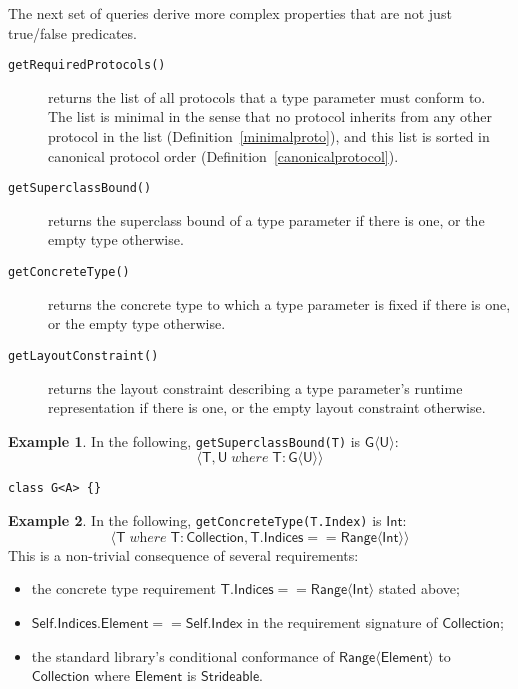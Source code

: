 \documentclass[headsepline,bibliography=totoc]{scrreport}
\newcommand{\namesym}[1]{\mathsf{#1}}
\newcommand{\genericparam}[1]{\bm{\mathsf{#1}}}
\newcommand{\proto}[1]{\bm{\mathsf{#1}}}
\newcommand{\gensig}[2]{\langle #1\;\textit{where}\;#2\rangle}
\theoremstyle{definition}
\newtheorem{example}{Example}[chapter]
\theoremstyle{definition}
\theoremstyle{definition}
\begin{document}
The next set of queries derive more complex properties that are not just true/false predicates.
\begin{description}
\item [\texttt{getRequiredProtocols()}] returns the list of all protocols that a type parameter must conform to. The list is minimal in the sense that no protocol inherits from any other protocol in the list (Definition~\ref{minimalproto}), and this list is sorted in canonical protocol order (Definition~\ref{canonicalprotocol}).
\item [\texttt{getSuperclassBound()}] returns the superclass bound of a type parameter if there is one, or the empty type otherwise.
\item [\texttt{getConcreteType()}] returns the concrete type to which a type parameter is fixed if there is one, or the empty type otherwise.
\item [\texttt{getLayoutConstraint()}] returns the layout constraint describing a type parameter's runtime representation if there is one, or the empty layout constraint otherwise.
\end{description}

\begin{example}
 In the following, \texttt{getSuperclassBound(T)} is $\namesym{G}\langle\genericparam{U}\rangle$:
\[\gensig{\genericparam{T}, \genericparam{U}}{\genericparam{T}\colon\namesym{G}\langle\genericparam{U}\rangle}\]
\begin{Verbatim}
class G<A> {}
\end{Verbatim} 
\end{example}

\begin{example}
In the following, \texttt{getConcreteType(T.Index)} is $\namesym{Int}$:
\[\gensig{\genericparam{T}}{\genericparam{T}\colon\proto{Collection},\genericparam{T}.\namesym{Indices}==\namesym{Range}\langle\namesym{Int}\rangle}\]
This is a non-trivial consequence of several requirements:
\begin{itemize}
\item the concrete type requirement $\genericparam{T}.\namesym{Indices}==\namesym{Range}\langle\namesym{Int}\rangle$ stated above;
\item $\genericparam{Self}.\namesym{Indices}.\namesym{Element}==\genericparam{Self}.\namesym{Index}$ in the requirement signature of $\proto{Collection}$;
\item the standard library's conditional conformance of $\namesym{Range}\langle\namesym{Element}\rangle$ to $\proto{Collection}$ where $\namesym{Element}$ is $\proto{Strideable}$.
\end{itemize}
\end{example}
\end{document}
